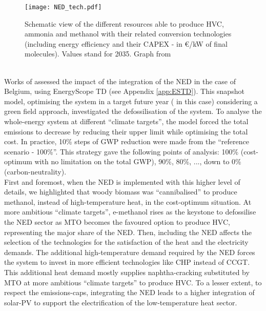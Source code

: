 \begin{figure}[htbp!]
\centering
\texttt{[image: NED\_tech.pdf]}
\caption{Schematic view of the different resources able to produce \gls{HVC}, ammonia and methanol with their related conversion technologies (including energy efficiency and their CAPEX - in €/kW of final molecules).  Values stand for 2035. Graph from \cite{rixhon2021comprehensive}}
\label{fig:NED_tech}
\end{figure}

\\

\noindent
Works of \citet{rixhon2021comprehensive,rixhon2022integration} assessed the impact of the integration of the \gls{NED} in the case of Belgium, using EnergyScope TD (see Appendix \ref{app:ESTD}).  This snapshot model, \ie optimising the system in a target future year ( in this case) considering a green field approach, investigated the defossilisation of the system. To analyse the whole-energy system at different ``climate targets'', the model forced the total emissions to decrease by reducing their upper limit while optimising the total cost. In practice, 10\% steps of \gls{GWP} reduction were made from the ``reference scenario - 100\%''. This strategy gave the following points of analysis: 100\% (\ie cost-optimum with no limitation on the total \gls{GWP}), 90\%, 80\%, ..., down to 0\% (\ie  carbon-neutrality).\\

First and foremost, when the \gls{NED} is implemented with this higher level of details, we highlighted that woody biomass was ``cannibalised'' to produce methanol, instead of high-temperature heat, in the cost-optimum situation. At more ambitious ``climate targets'', e-methanol rises as the keystone to defossilise the \gls{NED} sector as \gls{MTO} becomes the favoured option to produce \gls{HVC}, representing the major share of the \gls{NED}. Then, including the \gls{NED} affects the selection of the technologies for the satisfaction of the heat and the electricity demands. The additional high-temperature demand required by the \gls{NED} forces the system to invest in more efficient technologies like \gls{CHP} instead of \gls{CCGT}. This additional heat demand mostly supplies naphtha-cracking substituted by \gls{MTO} at more ambitious ``climate targets'' to produce \gls{HVC}. To a lesser extent, to respect the emissions-caps, integrating the \gls{NED} leads to a higher integration of solar-\gls{PV} to support the electrification of the low-temperature heat sector.\\


